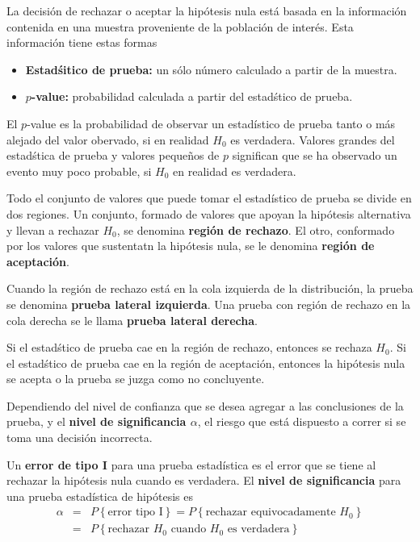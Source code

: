 \begin{frame}
La decisi\'on de rechazar o aceptar la hip\'otesis nula est\'a basada en la informaci\'on contenida en una muestra proveniente de la poblaci\'on de inter\'es. Esta informaci\'on tiene estas formas

\begin{itemize}
\item \textbf{Estad\'sitico de prueba:} un s\'olo n\'umero calculado a partir de la muestra.

\item \textbf{$p$-value:} probabilidad calculada a partir del estad\'stico de prueba.

\end{itemize}

\begin{Def}
El $p$-value es la probabilidad de observar un estad\'istico de prueba tanto o m\'as alejado del valor obervado, si en realidad $H_{0}$ es verdadera.\medskip
Valores grandes del estad\'stica de prueba  y valores peque\~nos de $p$ significan que se ha observado un evento muy poco probable, si $H_{0}$ en realidad es verdadera.
\end{Def}

Todo el conjunto de valores que puede tomar el estad\'istico de prueba se divide en dos regiones. Un conjunto, formado de valores que apoyan la hip\'otesis alternativa y llevan a rechazar $H_{0}$, se denomina \textbf{regi\'on de rechazo}. El otro, conformado por los valores que sustentatn la hip\'otesis nula, se le denomina \textbf{regi\'on de aceptaci\'on}.\medskip


Cuando la regi\'on de rechazo est\'a en la cola izquierda de la distribuci\'on, la  prueba se denomina \textbf{prueba lateral izquierda}. Una prueba con regi\'on de rechazo en la cola derecha se le llama \textbf{prueba lateral derecha}.\medskip

Si el estad\'stico de prueba cae en la regi\'on de rechazo, entonces se rechaza $H_{0}$. Si el estad\'stico de prueba cae en la regi\'on de aceptaci\'on, entonces la hip\'otesis nula se acepta o la prueba se juzga como no concluyente.\medskip

Dependiendo del nivel de confianza que se desea agregar a las conclusiones de la prueba, y el \textbf{nivel de significancia $\alpha$}, el riesgo que est\'a dispuesto a correr si se toma una decisi\'on incorrecta.

\begin{Def}
Un \textbf{error de tipo I} para una prueba estad\'istica es el error que se tiene al rechazar la hip\'otesis nula cuando es verdadera. El \textbf{nivel de significancia} para una prueba estad\'istica de hip\'otesis es
\begin{eqnarray*}
\alpha&=&P\left\{\textrm{error tipo I}\right\}=P\left\{\textrm{rechazar equivocadamente }H_{0}\right\}\\
&=&P\left\{\textrm{rechazar }H_{0}\textrm{ cuando }H_{0}\textrm{ es verdadera}\right\}
\end{eqnarray*}


\end{Def}
\end{frame}
